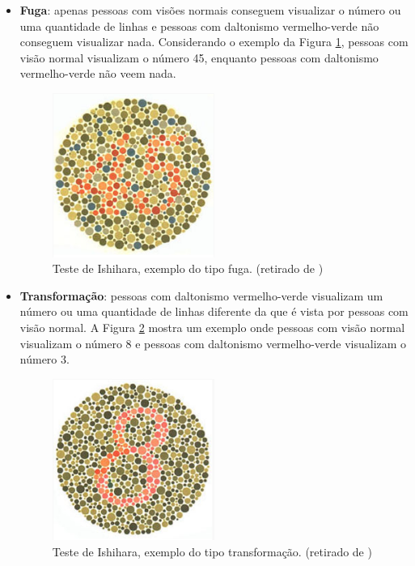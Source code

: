 \documentclass[	12pt, Times, openright, twoside, a4paper, english, brazil]{abntex2}
\begin{document}
\begin{itemize}
\item \textbf{Fuga}: apenas pessoas com visões normais conseguem visualizar o número ou uma quantidade de linhas e pessoas com daltonismo vermelho-verde não conseguem visualizar nada. Considerando o exemplo da Figura  \ref{fig:figuraIshiharaFuga}, pessoas com visão normal visualizam o número 45, enquanto pessoas com daltonismo vermelho-verde não veem nada.

\begin{figure}[!htb]
\centering \includegraphics[width=0.5\textwidth]{figuraIshiharaFuga.png}
\caption{Teste de Ishihara, exemplo do tipo fuga. (retirado de ) \label{fig:figuraIshiharaFuga}}
\end{figure}
 
\item \textbf{Transformação}: pessoas com daltonismo vermelho-verde visualizam um número ou uma quantidade de linhas diferente da que é vista por pessoas com visão normal. A Figura \ref{fig:figuraIshiharaTransformacao} mostra um exemplo onde pessoas com visão normal visualizam o número 8 e pessoas com daltonismo vermelho-verde visualizam o número 3.
 
\begin{figure}[!htb]
\centering \includegraphics[width=0.5\textwidth]{figuraIshiharaTransformacao.png}
\caption{Teste de Ishihara, exemplo do tipo transformação. (retirado de ) \label{fig:figuraIshiharaTransformacao}}
\end{figure}


\end{itemize}
\end{document}
